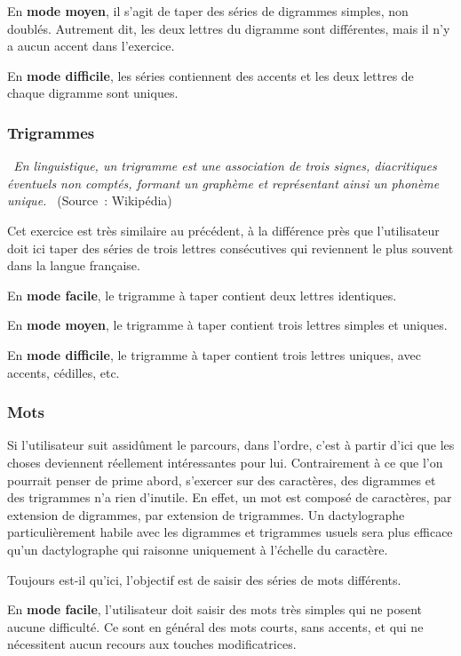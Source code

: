 \documentclass[a4paper,12pt]{article}
\begin{document}
En \textbf{mode moyen}, il s'agit de taper des séries de digrammes simples, non doublés. Autrement dit, les deux lettres du digramme sont différentes, mais il n'y a aucun accent dans l'exercice.

En \textbf{mode difficile}, les séries contiennent des accents et les deux lettres de chaque digramme sont uniques.

\subsubsection{Trigrammes}

\textit{\og~En linguistique, un trigramme est une association de trois signes, diacritiques éventuels non comptés, formant un graphème et représentant ainsi un phonème unique.~\fg} (Source~: Wikipédia)

Cet exercice est très similaire au précédent, à la différence près que l'utilisateur doit ici taper des séries de trois lettres consécutives qui reviennent le plus souvent dans la langue française.

En \textbf{mode facile}, le trigramme à taper contient deux lettres identiques.

En \textbf{mode moyen}, le trigramme à taper contient trois lettres simples et uniques.

En \textbf{mode difficile}, le trigramme à taper contient trois lettres uniques, avec accents, cédilles, etc.

\subsubsection{Mots}

Si l'utilisateur suit assidûment le parcours, dans l'ordre, c'est à partir d'ici que les choses deviennent réellement intéressantes pour lui. Contrairement à ce que l'on pourrait penser de prime abord, s'exercer sur des caractères, des digrammes et des trigrammes n'a rien d'inutile. En effet, un mot est composé de caractères, par extension de digrammes, par extension de trigrammes. Un dactylographe particulièrement habile avec les digrammes et trigrammes usuels sera plus efficace qu'un dactylographe qui raisonne uniquement à l'échelle du caractère.

Toujours est-il qu'ici, l'objectif est de saisir des séries de mots différents.

En \textbf{mode facile}, l'utilisateur doit saisir des mots très simples qui ne posent aucune difficulté. Ce sont en général des mots courts, sans accents, et qui ne nécessitent aucun recours aux touches modificatrices.
\end{document}
